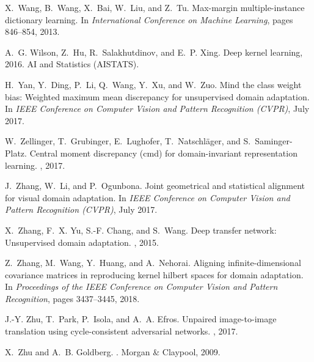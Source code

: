 \documentclass[10pt,letterpaper]{article}
\begin{document}
\begin{thebibliography}{10}
X.~Wang, B.~Wang, X.~Bai, W.~Liu, and Z.~Tu.
\newblock Max-margin multiple-instance dictionary learning.
\newblock In {\em International Conference on Machine Learning}, pages
  846--854, 2013.

A.~G. Wilson, Z.~Hu, R.~Salakhutdinov, and E.~P. Xing.
\newblock Deep kernel learning, 2016.
\newblock AI and Statistics (AISTATS).

H.~Yan, Y.~Ding, P.~Li, Q.~Wang, Y.~Xu, and W.~Zuo.
\newblock Mind the class weight bias: Weighted maximum mean discrepancy for
  unsupervised domain adaptation.
\newblock In {\em IEEE Conference on Computer Vision and Pattern Recognition
  (CVPR)}, July 2017.

W.~Zellinger, T.~Grubinger, E.~Lughofer, T.~Natschl{\"a}ger, and
  S.~Saminger-Platz.
\newblock Central moment discrepancy (cmd) for domain-invariant representation
  learning.
,
  2017.

J.~Zhang, W.~Li, and P.~Ogunbona.
\newblock Joint geometrical and statistical alignment for visual domain
  adaptation.
\newblock In {\em IEEE Conference on Computer Vision and Pattern Recognition
  (CVPR)}, July 2017.

X.~Zhang, F.~X. Yu, S.-F. Chang, and S.~Wang.
\newblock Deep transfer network: Unsupervised domain adaptation.
, 2015.

Z.~Zhang, M.~Wang, Y.~Huang, and A.~Nehorai.
\newblock Aligning infinite-dimensional covariance matrices in reproducing
  kernel hilbert spaces for domain adaptation.
\newblock In {\em Proceedings of the IEEE Conference on Computer Vision and
  Pattern Recognition}, pages 3437--3445, 2018.

J.-Y. Zhu, T.~Park, P.~Isola, and A.~A. Efros.
\newblock Unpaired image-to-image translation using cycle-consistent
  adversarial networks.
, 2017.

X.~Zhu and A.~B. Goldberg.
.
\newblock Morgan \& Claypool, 2009.

\end{thebibliography}
\end{document}
